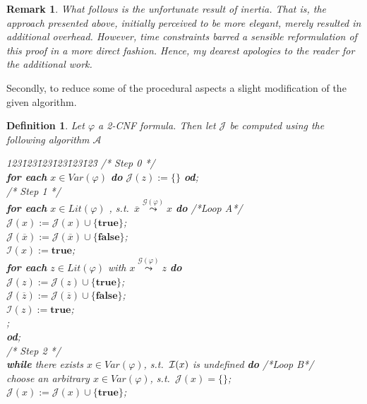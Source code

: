 \documentclass [11pt]{article}
\renewcommand{\phi}{\varphi}
\def\II{{\cal I}}
\newcommand{\True}{\mathbf{true}}
\newcommand{\False}{\mathbf{false}}
\def\ox{\overline{x}}
\newcommand{\var}{\mathit{Var}}
\newcommand{\lit}{\mathit{Lit}}
\newtheorem{definition}[theorem]{Definition}
\newtheorem{remark}[theorem]{Remark}
\newcommand{\sreach}[1]{\stackrel{#1}{\leadsto}}
\begin{document}
\begin{remark}
What follows is the unfortunate result of inertia. That is, the approach presented above, initially perceived to be more elegant, merely resulted in additional overhead.
However, time constraints barred a sensible reformulation of this proof in a more direct fashion. Hence, my dearest apologies to the reader for the additional work.
\end{remark}

Secondly, to reduce some of the procedural aspects a slight modification of the given algorithm.

\begin{definition}
Let $\varphi$ a 2-CNF formula. Then let $\mathcal{J}$ be computed using the following algorithm $\mathcal{A}$


\begin{tabbing}
123\=123\=123\=123\=123\=123\=\kill
/* Step 0 */ \\
\> {\bf for each} $x \in \var(\varphi)$ {\bf do}  $\mathcal{J}(z) :=\{\}$ {\bf od};\\
/* Step 1 */  \\
{\bf for each} $x \in \lit(\varphi)$ , s.t.\ $\overline{x} \sreach{\mathcal{G}(\varphi)} x$  {\bf do}   /*Loop A*/ \\
\> $\mathcal{J}(x) := \mathcal{J}(x) \cup \{ \True\}$; \\
\> $\mathcal{J}(\ox) := \mathcal{J}(\ox) \cup \{ \False\}$; \\
\> $\mathcal{I}(x) := \True$; \\
\> {\bf for each} $z \in \lit(\varphi)$ with $x  \sreach{\mathcal{G}(\varphi)} z$ {\bf do} \\
\>\> $\mathcal{J}(z) := \mathcal{J}(z) \cup \{ \True\}$; \\
\>\> $\mathcal{J}(\overline{z}) := \mathcal{J}(\overline{z}) \cup \{ \False\}$; \\
\>\> $\mathcal{I}(z) := \True$; \\
;\\
{\bf od}; 
\\[1.1ex]
/* Step 2 */  \\
{\bf while}  there exists $x \in \var(\phi)$, s.t.\ $\II(x)$ is undefined {\bf do}  /*Loop B*/  \\
\> choose an arbitrary $x \in \var(\varphi)$, s.t.\ $\mathcal{J}(x)=\{\}$;\\
\> $\mathcal{J}(x) := \mathcal{J}(x) \cup \{ \True\}$;  \\

\end{tabbing}
\end{definition}
\end{document}
